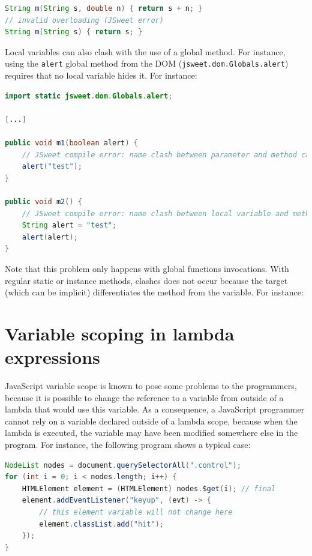 \documentclass[a4paper]{report}
\begin{document}
\begin{lstlisting}[language=Java]
String m(String s, double n) { return s + n; }
// invalid overloading (JSweet error)
String m(String s) { return s; }
\end{lstlisting}

Local variables can also clash with the use of a global method. For instance, using the \texttt{alert} global method from the DOM (\texttt{jsweet.dom.Globals.alert}) requires that no local variable hides it. For instance:

\begin{lstlisting}[language=Java]
import static jsweet.dom.Globals.alert;

[...]

public void m1(boolean alert) {
	// JSweet compile error: name clash between parameter and method call
	alert("test");
}

public void m2() {
	// JSweet compile error: name clash between local variable and method call
	String alert = "test";
	alert(alert);
}
\end{lstlisting}

Note that this problem only happens with global functions invocations. With regular static or instance methods, clashes does not occur because the target (which can be implicit) differentiates the method from the variable. For instance:



\section{Variable scoping in lambda expressions}

JavaScript variable scope is known to pose some problems to the programmers, because it is possible to change the reference to a variable from outside of a lambda that would use this variable. As a consequence, a JavaScript programmer cannot rely on a variable declared outside of a lambda scope, because when the lambda is executed, the variable may have been modified somewhere else in the program. For instance, the following program shows a typical case: 

\begin{lstlisting}[language=Java]
NodeList nodes = document.querySelectorAll(".control");
for (int i = 0; i < nodes.length; i++) {
	HTMLElement element = (HTMLElement) nodes.$get(i); // final
	element.addEventListener("keyup", (evt) -> {
	    // this element variable will not change here 
		element.classList.add("hit");
	});
}
\end{lstlisting}
\end{document}
